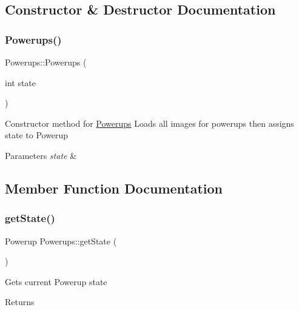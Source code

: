 \subsection{Constructor \& Destructor Documentation}
\mbox{\label{class_powerups_acfac7ce2910181c27fe04bf746d86ea5}} 
\subsubsection{\texorpdfstring{Powerups()}{Powerups()}}
{\footnotesize\ttfamily Powerups\+::\+Powerups (\begin{DoxyParamCaption}\item[{int}]{state }\end{DoxyParamCaption})}



Constructor method for \mbox{\hyperlink{class_powerups}{Powerups}} Loads all images for powerups then assigns state to Powerup 


\begin{DoxyParams}{Parameters}
{\em state} & \\
\hline
\end{DoxyParams}


\subsection{Member Function Documentation}
\mbox{\label{class_powerups_a71da1d29130fcbd9957815044eba11a7}} 
\subsubsection{\texorpdfstring{getState()}{getState()}}
{\footnotesize\ttfamily Powerup Powerups\+::get\+State (\begin{DoxyParamCaption}{ }\end{DoxyParamCaption})}



Gets current Powerup state 

\begin{DoxyReturn}{Returns}

\end{DoxyReturn}
\mbox{\label{class_powerups_a2ec98b6e80e478d6690f34db632c691c}} 
